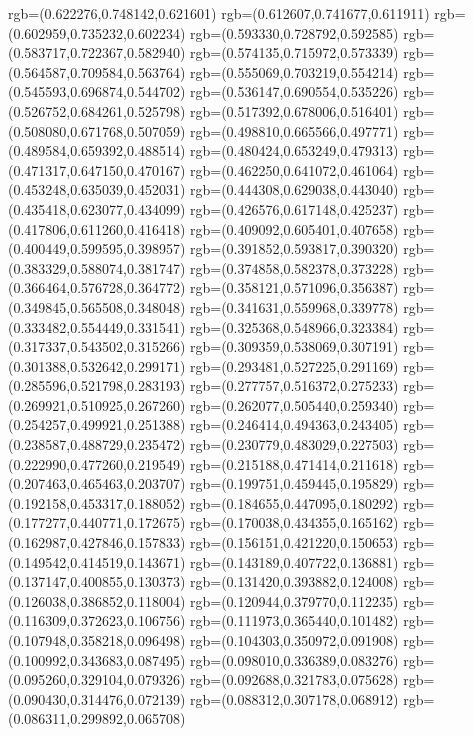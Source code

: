 {{{			rgb=(0.622276,0.748142,0.621601)
			rgb=(0.612607,0.741677,0.611911)
			rgb=(0.602959,0.735232,0.602234)
			rgb=(0.593330,0.728792,0.592585)
			rgb=(0.583717,0.722367,0.582940)
			rgb=(0.574135,0.715972,0.573339)
			rgb=(0.564587,0.709584,0.563764)
			rgb=(0.555069,0.703219,0.554214)
			rgb=(0.545593,0.696874,0.544702)
			rgb=(0.536147,0.690554,0.535226)
			rgb=(0.526752,0.684261,0.525798)
			rgb=(0.517392,0.678006,0.516401)
			rgb=(0.508080,0.671768,0.507059)
			rgb=(0.498810,0.665566,0.497771)
			rgb=(0.489584,0.659392,0.488514)
			rgb=(0.480424,0.653249,0.479313)
			rgb=(0.471317,0.647150,0.470167)
			rgb=(0.462250,0.641072,0.461064)
			rgb=(0.453248,0.635039,0.452031)
			rgb=(0.444308,0.629038,0.443040)
			rgb=(0.435418,0.623077,0.434099)
			rgb=(0.426576,0.617148,0.425237)
			rgb=(0.417806,0.611260,0.416418)
			rgb=(0.409092,0.605401,0.407658)
			rgb=(0.400449,0.599595,0.398957)
			rgb=(0.391852,0.593817,0.390320)
			rgb=(0.383329,0.588074,0.381747)
			rgb=(0.374858,0.582378,0.373228)
			rgb=(0.366464,0.576728,0.364772)
			rgb=(0.358121,0.571096,0.356387)
			rgb=(0.349845,0.565508,0.348048)
			rgb=(0.341631,0.559968,0.339778)
			rgb=(0.333482,0.554449,0.331541)
			rgb=(0.325368,0.548966,0.323384)
			rgb=(0.317337,0.543502,0.315266)
			rgb=(0.309359,0.538069,0.307191)
			rgb=(0.301388,0.532642,0.299171)
			rgb=(0.293481,0.527225,0.291169)
			rgb=(0.285596,0.521798,0.283193)
			rgb=(0.277757,0.516372,0.275233)
			rgb=(0.269921,0.510925,0.267260)
			rgb=(0.262077,0.505440,0.259340)
			rgb=(0.254257,0.499921,0.251388)
			rgb=(0.246414,0.494363,0.243405)
			rgb=(0.238587,0.488729,0.235472)
			rgb=(0.230779,0.483029,0.227503)
			rgb=(0.222990,0.477260,0.219549)
			rgb=(0.215188,0.471414,0.211618)
			rgb=(0.207463,0.465463,0.203707)
			rgb=(0.199751,0.459445,0.195829)
			rgb=(0.192158,0.453317,0.188052)
			rgb=(0.184655,0.447095,0.180292)
			rgb=(0.177277,0.440771,0.172675)
			rgb=(0.170038,0.434355,0.165162)
			rgb=(0.162987,0.427846,0.157833)
			rgb=(0.156151,0.421220,0.150653)
			rgb=(0.149542,0.414519,0.143671)
			rgb=(0.143189,0.407722,0.136881)
			rgb=(0.137147,0.400855,0.130373)
			rgb=(0.131420,0.393882,0.124008)
			rgb=(0.126038,0.386852,0.118004)
			rgb=(0.120944,0.379770,0.112235)
			rgb=(0.116309,0.372623,0.106756)
			rgb=(0.111973,0.365440,0.101482)
			rgb=(0.107948,0.358218,0.096498)
			rgb=(0.104303,0.350972,0.091908)
			rgb=(0.100992,0.343683,0.087495)
			rgb=(0.098010,0.336389,0.083276)
			rgb=(0.095260,0.329104,0.079326)
			rgb=(0.092688,0.321783,0.075628)
			rgb=(0.090430,0.314476,0.072139)
			rgb=(0.088312,0.307178,0.068912)
			rgb=(0.086311,0.299892,0.065708)
}}}
